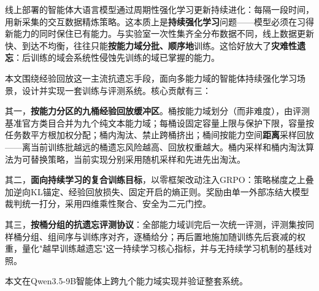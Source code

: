 \begin{abstractzh}
线上部署的智能体大语言模型通过周期性强化学习更新持续进化：每隔一段时间，用新采集的交互数据精炼策略。这本质上是\textbf{持续强化学习}问题——模型必须在习得新能力的同时保住已有能力。与实验室一次性集齐全分布数据不同，线上数据更新快、到达不均衡，往往只能\textbf{按能力域分批、顺序地}训练。这恰好放大了\textbf{灾难性遗忘}：后训练的域会系统性侵蚀先训练的域已掌握的能力。

本文围绕经验回放这一主流抗遗忘手段，面向多能力域的智能体持续强化学习场景，设计并实现一套训练与评测系统。核心贡献有三：

其一，\textbf{按能力分区的九桶经验回放缓冲区}。桶按能力域划分（而非难度），由评测基准官方类目合并为九个纯文本能力域；每桶设固定容量上限与保护下限，容量按任务数平方根加权分配；桶内淘汰、禁止跨桶挤出；桶间按能力空间\textbf{距离}采样回放——离当前训练批越远的桶遗忘风险越高、回放权重越大。桶内采样和桶内淘汰算法为可替换策略，当前实现分别采用随机采样和先进先出淘汰。

其二，\textbf{面向持续学习的复合训练目标}，以零框架改动注入GRPO：策略梯度之上叠加逆向KL锚定、经验回放损失、固定开启的熵正则。奖励由单一外部冻结大模型裁判统一打分，采用四维乘性聚合、安全为二元门控。

其三，\textbf{按桶分组的抗遗忘评测协议}：全部能力域训完后一次统一评测，评测集按同样桶分组、组间序与训练序对齐，逐桶给分；再后置地施加随训练先后衰减的权重，量化"越早训练越遗忘"这一持续学习核心指标，并与无持续学习机制的基线对照。

本文在Qwen3.5-9B智能体上跨九个能力域实现并验证整套系统。
\end{abstractzh}

